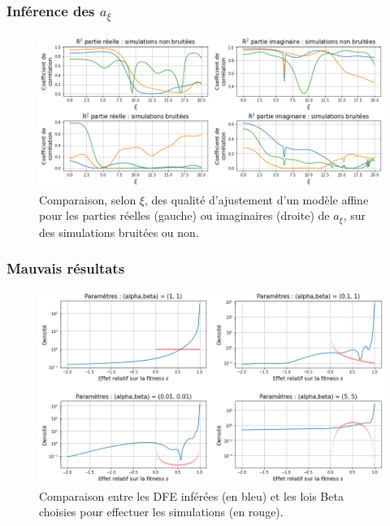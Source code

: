\documentclass{beamer}
\begin{document}
\begin{frame}
  \frametitle{Inférence des $a_{\xi}$}

\begin{figure}[h]
  \begin{center}
    \includegraphics[width=0.9\linewidth]{../Img/DFE_R2.png}
  \end{center}
  \caption{\label{fig:DFE_R2}Comparaison, selon $\xi$, des qualité d'ajustement d'un modèle affine pour les parties réelles (gauche) ou imaginaires (droite) de $a_{\xi}$, sur des simulations bruitées ou non.}
\end{figure}

\end{frame}

\begin{frame}
  \frametitle{Mauvais résultats}
  
  \begin{figure}[h]
    \begin{center}
      \includegraphics[width=0.9\linewidth]{../Img/DFE_inferred.png}
    \end{center}
    \caption{\label{fig:DFE}Comparaison entre les DFE inférées (en bleu) et les lois Beta choisies pour effectuer les simulations (en rouge).}
  \end{figure}


\end{frame}
\end{document}

